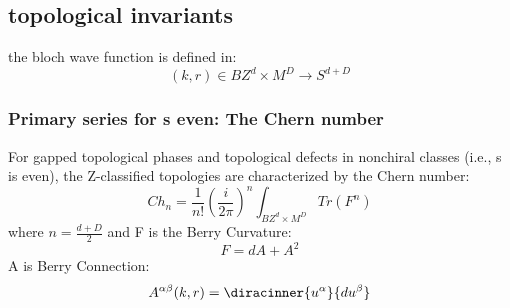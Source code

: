 \subsection{topological invariants}
the bloch wave function is defined in:
\[(k,r)\in BZ^d\times M^D\rightarrow S^{d+D}\]
\subsubsection{Primary series for s even: The Chern number}
For gapped topological phases and topological defects in
nonchiral classes (i.e., s is even), the Z-classified topologies
are characterized by the Chern number:
\[Ch_n=\frac{1}{n!}(\frac{i}{2\pi})^n\int_{BZ^d\times M^D}Tr(F^n)\]
where $n=\frac{d+D}{2}$ and F is the Berry Curvature:
\[F=dA+A^2\]
A is Berry Connection:
\[A^{\alpha \beta}(k,r)=\diracinner{u^{\alpha}}{du^{\beta}}\]
